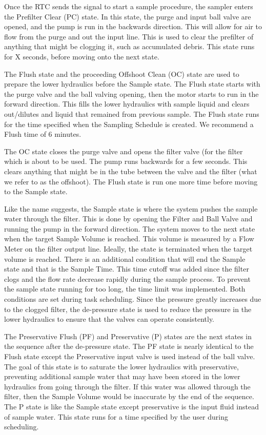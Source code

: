 \documentclass[11pt, letterpaper]{article}
\begin{document}
Once the RTC sends the signal to start a sample procedure, the sampler enters the Prefilter Clear (PC) state. In this state, the purge and input ball valve are opened, and the pump is run in the backwards direction. This will allow for air to flow from the purge and out the input line. This is used to clear the prefilter of anything that might be clogging it, such as accumulated debris. This state runs for X seconds, before moving onto the next state. 

The Flush state and the proceeding Offshoot Clean (OC) state are used to prepare the lower hydraulics before the Sample state. The Flush state starts with the purge valve and the ball valving opening, then the motor starts to run in the forward direction. This fills the lower hydraulics with sample liquid and clears out/dilutes and liquid that remained from previous sample. The Flush state runs for the time specified when the Sampling Schedule is created. We recommend a Flush time of 6 minutes. 

The OC state closes the purge valve and opens the filter valve (for the filter which is about to be used. The pump runs backwards for a few seconds. This clears anything that might be in the tube between the valve and the filter (what we refer to as the offshoot). The Flush state is run one more time before moving to the Sample state.

Like the name suggests, the Sample state is where the system pushes the sample water through the filter. This is done by opening the Filter and Ball Valve and running the pump in the forward direction. The system moves to the next state when the target Sample Volume is reached. This volume is measured by a Flow Meter on the filter output line. Ideally, the state is terminated when the target volume is reached. There is an additional condition that will end the Sample state and that is the Sample Time. This time cutoff was added since the filter clogs and the flow rate decrease rapidly during the sample process. To prevent the sample state running for too long, the time limit was implemented. Both conditions are set during task scheduling. Since the pressure greatly increases due to the clogged filter, the de-pressure state is used to reduce the pressure in the lower hydraulics to ensure that the valves can operate consistently.

The Preservative Flush (PF) and Preservative (P) states are the next states in the sequence after the de-pressure state. The PF state is nearly identical to the Flush state except the Preservative input valve is used instead of the ball valve. The goal of this state is to saturate the lower hydraulics with preservative, preventing additional sample water that may have been stored in the lower hydraulics from going through the filter. If this water was allowed through the filter, then the Sample Volume would be inaccurate by the end of the sequence. The P state is like the Sample state except preservative is the input fluid instead of sample water. This state runs for a time specified by the user during scheduling.  
\end{document}
